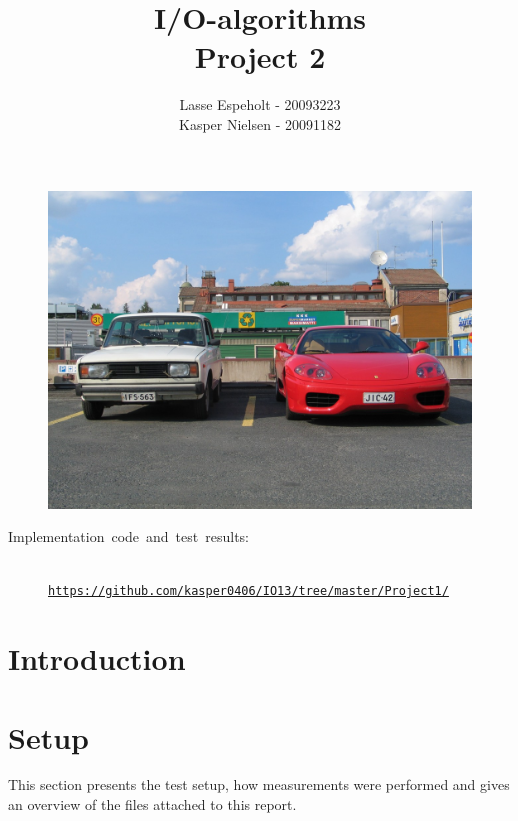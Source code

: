 \documentclass[a4paper,12pt]{article}
\begin{document}
\title{I/O-algorithms\\Project 2}

\author{Lasse Espeholt - 20093223\\
Kasper Nielsen - 20091182\\}

\maketitle
\begin{figure}[h!]
\includegraphics[width=\textwidth]{"images/forside"}
\end{figure}


\vfill{}
\begin{description}
\item [{Implementation~code~and~test~results:}]~
\\
\texttt{\url{https://github.com/kasper0406/IO13/tree/master/Project1/}}
\end{description}
\pagebreak{}\tableofcontents{}\pagebreak{}

\section{Introduction}


\section{Setup}
This section presents the test setup, how measurements were performed
and gives an overview of the files attached to this report.
\end{document}
